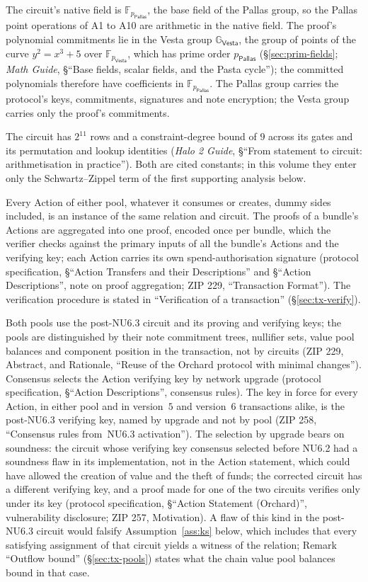\documentclass[11pt,a4paper]{article}
\theoremstyle{definition}
\newcommand{\F}{\mathbb{F}}
\newcommand{\G}{\mathbb{G}}
\newcommand{\Pallas}{\ensuremath{\mathsf{Pallas}}}
\newcommand{\Vesta}{\ensuremath{\mathsf{Vesta}}}
\begin{document}
The circuit's native field is $\F_{p_{\Pallas}}$, the base field of the
Pallas group, so the Pallas point operations of A1 to A10 are arithmetic in
the native field. The proof's polynomial commitments lie in the Vesta group
$\G_{\Vesta}$, the group of points of the curve $y^2 = x^3 + 5$ over
$\F_{p_{\Vesta}}$, which has prime order $p_{\Pallas}$ (\S\ref{sec:prim-fields};
\emph{Math Guide}, \S``Base fields, scalar fields, and the Pasta cycle''); the
committed polynomials therefore have coefficients in $\F_{p_{\Pallas}}$. The
Pallas group carries the protocol's keys, commitments, signatures and note
encryption; the Vesta group carries only the proof's commitments.

The circuit has $2^{11}$ rows and a constraint-degree bound of $9$ across its
gates and its permutation and lookup identities (\emph{Halo 2 Guide},
\S``From statement to circuit: arithmetisation in practice''). Both are cited
constants; in this volume they enter only the Schwartz--Zippel term of the
first supporting analysis below.

Every Action of either pool, whatever it consumes or creates, dummy sides
included, is an instance of the same relation and circuit. The proofs of a
bundle's Actions are aggregated into one proof, encoded once per bundle,
which the verifier checks against the primary inputs of all the bundle's
Actions and the verifying key; each Action carries its own
spend-authorisation signature (protocol specification, \S``Action Transfers
and their Descriptions'' and \S``Action Descriptions'', note on proof
aggregation; ZIP 229, ``Transaction Format''). The verification procedure is
stated in ``Verification of a transaction'' (\S\ref{sec:tx-verify}).

Both pools use the post-NU6.3 circuit and its proving and verifying keys; the
pools are distinguished by their note commitment trees, nullifier sets, value
pool balances and component position in the transaction, not by circuits
(ZIP 229, Abstract, and Rationale, ``Reuse of the Orchard protocol with
minimal changes''). Consensus selects the Action verifying key by network
upgrade (protocol specification, \S``Action Descriptions'', consensus rules).
The key in force for every Action, in either pool and in version~$5$ and
version~$6$ transactions alike, is the post-NU6.3 verifying key, named by
upgrade and not by pool (ZIP 258, ``Consensus rules from~NU6.3
activation''). The selection by upgrade bears on soundness: the circuit
whose verifying key consensus selected before NU6.2 had a soundness flaw in
its implementation, not in the Action statement, which could have allowed
the creation of value and the theft of funds; the corrected circuit has a
different verifying key, and a proof made for one of the two circuits
verifies only under its key (protocol specification, \S``Action Statement
(Orchard)'', vulnerability disclosure; ZIP 257, Motivation). A flaw of this
kind in the post-NU6.3 circuit would falsify Assumption~\ref{ass:ks} below,
which includes that every satisfying assignment of that circuit yields a
witness of the relation; Remark ``Outflow bound'' (\S\ref{sec:tx-pools})
states what the chain value pool balances bound in that case.
\end{document}

